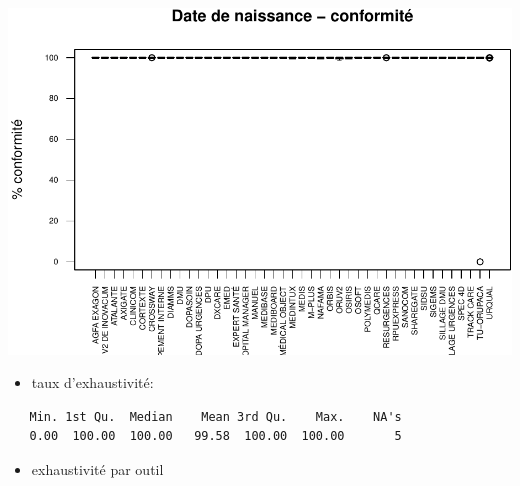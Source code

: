 \documentclass[]{article}
\begin{document}
\includegraphics{septembre2015_files/figure-latex/unnamed-chunk-15-1.pdf}

\begin{itemize}
\itemsep1pt\parskip0pt
\item
  taux d'exhaustivité:
\end{itemize}

\begin{verbatim}
   Min. 1st Qu.  Median    Mean 3rd Qu.    Max.    NA's 
   0.00  100.00  100.00   99.58  100.00  100.00       5 
\end{verbatim}

\begin{itemize}
\itemsep1pt\parskip0pt
\item
  exhaustivité par outil
\end{itemize}
\end{document}
